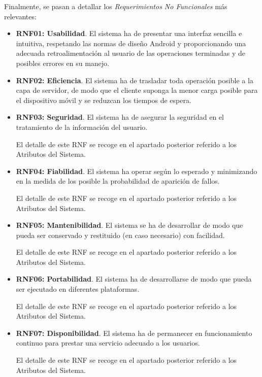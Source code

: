 Finalmente, se pasan a detallar los \emph{Requerimientos No Funcionales} más relevantes:

\begin{itemize}
	\item \textbf{RNF01: Usabilidad}. El sistema ha de presentar una interfaz sencilla e intuitiva, respetando las normas de diseño Android y proporcionando una adecuada retroalimentación al usuario de las operaciones terminadas y de posibles errores en su manejo.
	
	\item \textbf{RNF02: Eficiencia}. El sistema ha de trasladar toda operación posible a la capa de servidor, de modo que el cliente suponga la menor carga posible para el dispositivo móvil y se reduzcan los tiempos de espera.

	\item \textbf{RNF03: Seguridad}. El sistema ha de asegurar la seguridad en el tratamiento de la información del usuario. 
	
	El detalle de este RNF se recoge en el apartado posterior referido a los Atributos del Sistema.
	
	\item \textbf{RNF04: Fiabilidad}. El sistema ha operar según lo esperado y minimizando en la medida de los posible la probabilidad de aparición de fallos.
	
	El detalle de este RNF se recoge en el apartado posterior referido a los Atributos del Sistema.
	
	\item \textbf{RNF05: Mantenibilidad}. El sistema se ha de desarrollar de modo que pueda ser conservado y restituido (en caso necesario) con facilidad.
	
	El detalle de este RNF se recoge en el apartado posterior referido a los Atributos del Sistema.
	
	\item \textbf{RNF06: Portabilidad}. El sistema ha de desarrollarse de modo que pueda ser ejecutado en diferentes plataformas. 
	
	El detalle de este RNF se recoge en el apartado posterior referido a los Atributos del Sistema.
	
	\item \textbf{RNF07: Disponibilidad}. El sistema ha de permanecer en funcionamiento continuo para prestar una servicio adecuado a los usuarios.
	
	El detalle de este RNF se recoge en el apartado posterior referido a los Atributos del Sistema.
	
\end{itemize}

